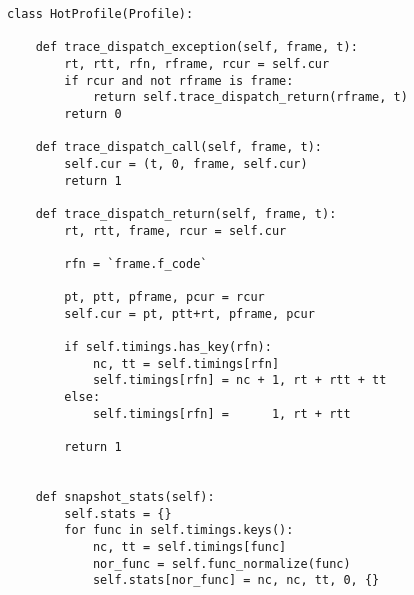 \bcode\begin{verbatim}
class HotProfile(Profile):

    def trace_dispatch_exception(self, frame, t):
        rt, rtt, rfn, rframe, rcur = self.cur
        if rcur and not rframe is frame:
            return self.trace_dispatch_return(rframe, t)
        return 0

    def trace_dispatch_call(self, frame, t):
        self.cur = (t, 0, frame, self.cur)
        return 1

    def trace_dispatch_return(self, frame, t):
        rt, rtt, frame, rcur = self.cur

        rfn = `frame.f_code`

        pt, ptt, pframe, pcur = rcur
        self.cur = pt, ptt+rt, pframe, pcur

        if self.timings.has_key(rfn):
            nc, tt = self.timings[rfn]
            self.timings[rfn] = nc + 1, rt + rtt + tt
        else:
            self.timings[rfn] =      1, rt + rtt

        return 1


    def snapshot_stats(self):
        self.stats = {}
        for func in self.timings.keys():
            nc, tt = self.timings[func]
            nor_func = self.func_normalize(func)
            self.stats[nor_func] = nc, nc, tt, 0, {}
\end{verbatim}\ecode
